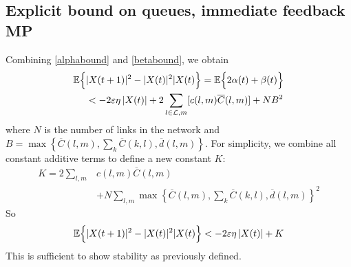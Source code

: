 \subsection*{Explicit bound on queues, immediate feedback MP}

Combining \eqref{alphabound} and \eqref{betabound}, we obtain
\begin{align}
\mathbb{E}\Big\{ &|X(t+1)|^{2} - |X(t)|^{2}  |   X(t) \Big\} = \mathbb{E}\Big\{ 2\alpha(t) + \beta(t) \Big\} \nonumber \\
&<  -2\varepsilon \eta \left| X(t ) \right| + 2 \sum_{l \in \mathcal{L},m} [c(l,m)\overline{C} (l,m) ]+ NB^{2}
\end{align}
where $N$ is the number of links in the network and $B=\max\left\{ \overline{C}(l,m), \sum_{k} \overline{C}(k,l),  \overline d (l,m) \right\}$. 
For simplicity, we combine all constant additive terms to define a new constant $K$:
\begin{align}\label{constCalc}
K = 2 \displaystyle\sum_{l,m} & c(l,m) \overline{C}(l,m) \\
\nonumber & + N \displaystyle\sum_{l,m} \max\left\{ \overline{C}(l,m), \sum_{k} \overline{C}(k,l),  \overline d (l,m) \right\}^2
\end{align}
So
\begin{equation}\label{stabBasic}
\expectation{|X(t+1)|^{2} - |X(t)|^{2}  |   X(t)} < -2\varepsilon \eta \left| X(t ) \right| + K
\end{equation}
This is sufficient to show stability as previously defined.








